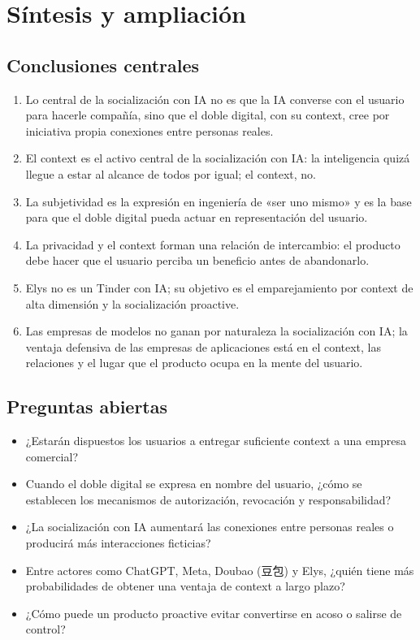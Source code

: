 \section{Síntesis y ampliación}

\subsection{Conclusiones centrales}

\begin{enumerate}
\item Lo central de la socialización con IA no es que la IA converse con el usuario para hacerle compañía, sino que el doble digital, con su context, cree por iniciativa propia conexiones entre personas reales.
\item El context es el activo central de la socialización con IA: la inteligencia quizá llegue a estar al alcance de todos por igual; el context, no.
\item La subjetividad es la expresión en ingeniería de «ser uno mismo» y es la base para que el doble digital pueda actuar en representación del usuario.
\item La privacidad y el context forman una relación de intercambio: el producto debe hacer que el usuario perciba un beneficio antes de abandonarlo.
\item Elys no es un Tinder con IA; su objetivo es el emparejamiento por context de alta dimensión y la socialización proactive.
\item Las empresas de modelos no ganan por naturaleza la socialización con IA; la ventaja defensiva de las empresas de aplicaciones está en el context, las relaciones y el lugar que el producto ocupa en la mente del usuario.
\end{enumerate}

\subsection{Preguntas abiertas}

\begin{itemize}
\item ¿Estarán dispuestos los usuarios a entregar suficiente context a una empresa comercial?
\item Cuando el doble digital se expresa en nombre del usuario, ¿cómo se establecen los mecanismos de autorización, revocación y responsabilidad?
\item ¿La socialización con IA aumentará las conexiones entre personas reales o producirá más interacciones ficticias?
\item Entre actores como ChatGPT, Meta, Doubao (豆包) y Elys, ¿quién tiene más probabilidades de obtener una ventaja de context a largo plazo?
\item ¿Cómo puede un producto proactive evitar convertirse en acoso o salirse de control?
\end{itemize}

